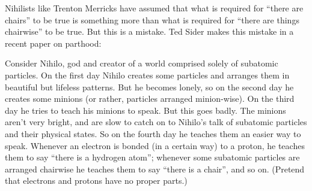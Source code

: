 \documentclass[11pt]{article}
\newenvironment{squote}{%
\begin{spacing}{1}
       	\begin{list}{}{%
\setlength{\labelwidth}{0pt}%
\rightmargin\leftmargin%
}
\item\relax
}{%
\end{list}%
\end{spacing}
}
\begin{document}
\begin{spacing}{1.25}


Nihilists like Trenton Merricks have assumed that what is required for
``there are chairs'' to be true is something more than what is
required for ``there are things chairwise'' to be true.  But this is a
mistake.  Ted Sider makes this mistake in a recent paper on parthood:

\begin{squote}
Consider Nihilo, god and creator of a world comprised solely of
subatomic particles.  On the first day Nihilo creates some particles
and arranges them in beautiful but lifeless patterns.  But he becomes
lonely, so on the second day he creates some minions (or rather,
particles arranged minion-wise).  On the third day he tries to teach
his minions to speak.  But this goes badly.  The minions aren't very
bright, and are slow to catch on to Nihilo's talk of subatomic
particles and their physical states.  So on the fourth day he teaches
them an easier way to speak.  Whenever an electron is bonded (in a
certain way) to a proton, he teaches them to say ``there is a hydrogen
atom''; whenever some subatomic particles are arranged chairwise he
teaches them to say ``there is a chair'', and so on.  (Pretend that
electrons and protons have no proper parts.)


\end{squote}
\end{spacing}
\end{document}
